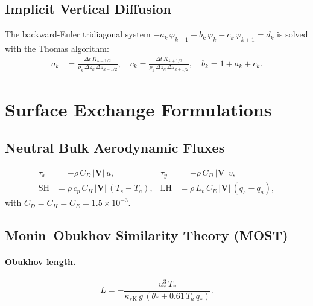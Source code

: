 \documentclass[11pt,twoside]{report}
\newcommand{\cpd}{c_p}
\newcommand{\Lv}{L_v}
\newcommand{\vect}[1]{\bm{#1}}
\begin{document}
\subsection{Implicit Vertical Diffusion}

The backward-Euler tridiagonal system
$-a_k\,\varphi_{k-1}+b_k\,\varphi_k-c_k\,\varphi_{k+1}=d_k$ is solved
with the Thomas algorithm:
\begin{align}
  a_k &= \frac{\Delta t\,K_{k-1/2}}{\rho_k\,\Delta z_k\,\Delta z_{k-1/2}},
  \quad c_k = \frac{\Delta t\,K_{k+1/2}}{\rho_k\,\Delta z_k\,\Delta z_{k+1/2}},
  \quad b_k = 1+a_k+c_k.
\end{align}


\section{Surface Exchange Formulations}
\label{sec:surface}

\subsection{Neutral Bulk Aerodynamic Fluxes}
\begin{align}
  \tau_x &= -\rho\,C_D\,|\vect{V}|\,u, &
  \tau_y &= -\rho\,C_D\,|\vect{V}|\,v, \\
  \mathrm{SH} &= \rho\,\cpd\,C_H\,|\vect{V}|\,(T_s-T_a), &
  \mathrm{LH} &= \rho\,\Lv\,C_E\,|\vect{V}|\,(q_s-q_a),
\end{align}
with $C_D=C_H=C_E=1.5\times10^{-3}$.

\subsection{Monin--Obukhov Similarity Theory (MOST)}

\paragraph{Obukhov length.}
\begin{equation}
  L = -\frac{u_*^3\,T_v}
  {\kappa_{\mathrm{vK}}\,g\,(\theta_*+0.61\,T_a\,q_*)}.
\end{equation}
\end{document}
